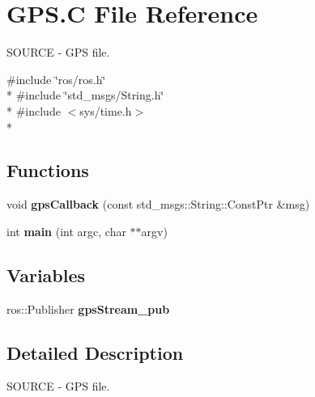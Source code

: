 \hypertarget{GPS_8C}{\section{G\-P\-S.\-C File Reference}
\label{GPS_8C}
}


S\-O\-U\-R\-C\-E -\/ G\-P\-S file.  


{\ttfamily \#include \char`\"{}ros/ros.\-h\char`\"{}}\\*
{\ttfamily \#include \char`\"{}std\-\_\-msgs/\-String.\-h\char`\"{}}\\*
{\ttfamily \#include $<$sys/time.\-h$>$}\\*
\subsection*{Functions}
\begin{DoxyCompactItemize}
\item 
\hypertarget{GPS_8C_a479e2c182792f10b8967ab2a460b706c}{void {\bfseries gps\-Callback} (const std\-\_\-msgs\-::\-String\-::\-Const\-Ptr \&msg)}\label{GPS_8C_a479e2c182792f10b8967ab2a460b706c}

\item 
\hypertarget{GPS_8C_a3c04138a5bfe5d72780bb7e82a18e627}{int {\bfseries main} (int argc, char $\ast$$\ast$argv)}\label{GPS_8C_a3c04138a5bfe5d72780bb7e82a18e627}

\end{DoxyCompactItemize}
\subsection*{Variables}
\begin{DoxyCompactItemize}
\item 
\hypertarget{GPS_8C_a8748ba2164866b808be38475eb8345df}{ros\-::\-Publisher {\bfseries gps\-Stream\-\_\-pub}}\label{GPS_8C_a8748ba2164866b808be38475eb8345df}

\end{DoxyCompactItemize}


\subsection{Detailed Description}
S\-O\-U\-R\-C\-E -\/ G\-P\-S file. 